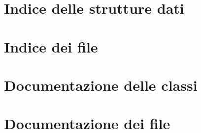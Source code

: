\documentclass[twoside]{book}
\newcommand{\+}{\discretionary{\mbox{\scriptsize$\hookleftarrow$}}{}{}}
\begin{document}
\chapter{Indice delle strutture dati}

\chapter{Indice dei file}

\chapter{Documentazione delle classi}










\chapter{Documentazione dei file}









































































\newpage
{}
{}
\printindex
\end{document}
